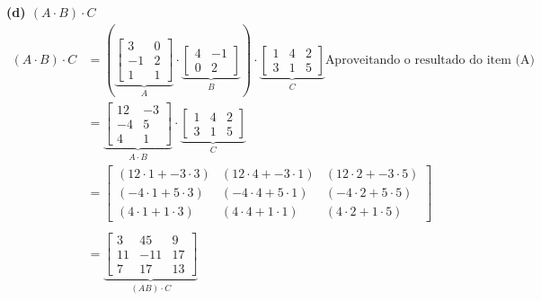 \documentclass[a4paper,12pt]{article}
\begin{document}
\textbf{(d) $(A\cdot B)\cdot C$}
\begin{align*}
    (A\cdot B)\cdot C &=( 
    \underbrace{
    \begin{bmatrix}
        3 & 0\\
        -1 & 2\\
        1 & 1
    \end{bmatrix}}_{A} 
    \cdot
    \underbrace{
    \begin{bmatrix}
        4 & -1\\
        0 & 2
    \end{bmatrix}}_{B})
    \cdot
    \underbrace{
    \begin{bmatrix}
        1 & 4 & 2\\
        3 & 1 & 5
    \end{bmatrix}}_{C}
    \textrm{Aproveitando o resultado do item (A)} \\
    &=
    \underbrace{
    \begin{bmatrix}
        12 & -3\\
        -4 & 5 \\
        4 & 1
    \end{bmatrix}}_{A \cdot B}
    \cdot
    \underbrace{
    \begin{bmatrix}
        1 & 4 & 2\\
        3 & 1 & 5
    \end{bmatrix}}_{C} \\
    &=
    \begin{bmatrix}
        (12 \cdot 1 + -3 \cdot 3) & (12 \cdot 4 + -3 \cdot 1) & (12 \cdot 2 + -3 \cdot 5)\\
        (-4 \cdot 1 + 5 \cdot 3) & (-4 \cdot 4 + 5 \cdot 1) & (-4 \cdot 2 + 5 \cdot 5)\\
        (4 \cdot 1 + 1 \cdot 3) & (4 \cdot 4 + 1 \cdot 1) & (4 \cdot 2 + 1 \cdot 5)
    \end{bmatrix} \\ \\
    &=
    \underbrace{
    \begin{bmatrix}
        3 & 45 & 9 \\
        11 & -11 & 17 \\
        7 & 17 & 13
    \end{bmatrix}}_{(AB) \cdot C}
\end{align*}
\end{document}
